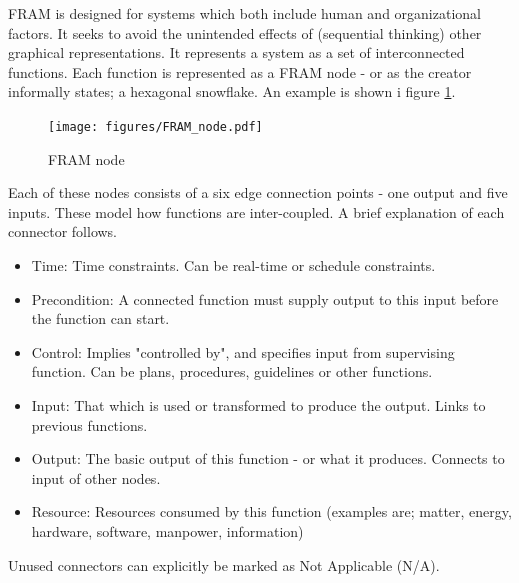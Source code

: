 \documentclass[10pt,oneside]{book}                  %
\begin{document}
FRAM is designed for systems which both include human and organizational factors. It seeks to avoid the unintended effects of (sequential thinking) other graphical representations. It represents a system as a set of interconnected functions. Each function is represented as a FRAM node - or as the creator informally states; a hexagonal snowflake. An example is shown i figure \ref{fig:fram_node}.

\begin{figure}[h]
 \centering
   \texttt{[image: figures/FRAM\_node.pdf]}
 \caption{FRAM node}
 \label{fig:fram_node}
\end{figure}

Each of these nodes consists of a six edge connection points - one output and five inputs. These  model how functions are inter-coupled. A brief explanation of each connector follows.


\begin{itemize}
  \item Time: Time constraints. Can be real-time or schedule constraints.

  \item Precondition: A connected function must supply output to this input before the function can start.

  \item Control: Implies "controlled by", and specifies input from supervising function. Can be plans, procedures, guidelines or other functions.
  
  \item Input: That which is used or transformed to produce the output. Links to previous functions.

  \item Output: The basic output of this function - or what it produces. Connects to input of other nodes.
  \item Resource: Resources consumed by this function (examples are; matter, energy, hardware, software, manpower, information)
\end{itemize} 
Unused connectors can explicitly be marked as Not Applicable (N/A).
\end{document}
